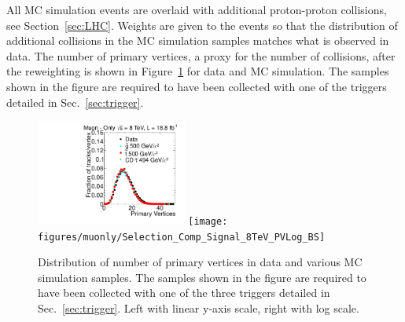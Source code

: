 All MC simulation events are overlaid with additional proton-proton collisions, see Section~\ref{sec:LHC}.
Weights are given to the events so that the distribution of additional collisions in the MC simulation samples matches what is observed in data.
The number of primary vertices, a proxy for the number of collisions, after the reweighting is shown in Figure~\ref{fig:PV} for data and MC simulation.
The samples shown in the figure are required to have been collected with one of the triggers detailed in Sec.~\ref{sec:trigger}.

\begin{figure}
  \begin{center}
      \includegraphics[clip=false, trim=0.0cm 0cm 0.0cm 0cm, width=0.44\textwidth]{figures/muonly/Selection_Comp_Signal_8TeV_PV_BS}
      \texttt{[image: figures/muonly/Selection\_Comp\_Signal\_8TeV\_PVLog\_BS]} \\
  \end{center}
        \caption[Distribution of number of primary vertices in data and various MC simulation samples]
{Distribution of number of primary vertices in data and various MC simulation samples. 
The samples shown in the figure are required to have been collected with one of the three triggers detailed in Sec.~\ref{sec:trigger}.
Left with linear y-axis scale, right with log scale.
        }
      \label{fig:PV}
\end{figure}